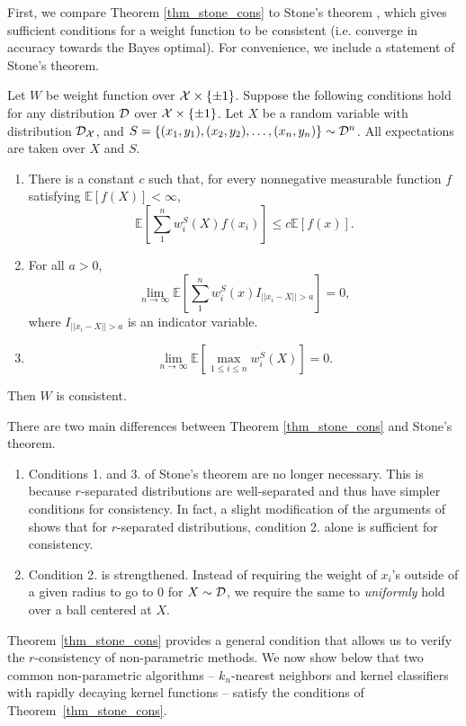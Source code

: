 First, we compare Theorem \ref{thm_stone_cons} to Stone's theorem \cite{Stone77}, which gives sufficient conditions for a weight function to be consistent (i.e. converge in accuracy towards the Bayes optimal). For convenience, we include a statement of Stone's theorem. 
\begin{thm}\label{thm_stone}
\cite{Stone77} Let $W$ be weight function over $\mathcal X \times \{\pm 1\}$. Suppose the following conditions hold for any distribution ${\mathcal D}$ over $\mathcal X \times \{\pm 1\}$.  Let $X$ be a random variable with distribution ${\mathcal D}_\mathcal X$, and $S = \{(x_1, y_1), (x_2, y_2), \dots, (x_n, y_n)\} \sim {\mathcal D}^n$. All expectations are taken over $X$ and $S$. 
\begin{enumerate}
	\item There is a constant $c$ such that, for every nonnegative measurable function $f$ satisfying $\mathbb{E} [f(X)] < \infty$, $$\mathbb{E} [\sum_1^n w_i^S(X)f(x_i)] \leq c \mathbb{E} [f(x)].$$
	\item For all $a > 0$, $$\lim_{n \to \infty} \mathbb{E}[\sum_1^n w_i^S(x)I_{||x_i - X|| > a}] = 0,$$ where $I_{||x_i - X|| > a}$ is an indicator variable. 
	\item $$\lim_{n \to \infty} \mathbb{E}[\max_{1 \leq i \leq n} w_i^S(X)] = 0.$$
\end{enumerate}
Then $W$ is consistent. 
\end{thm}
There are two main differences between Theorem \ref{thm_stone_cons} and Stone's theorem.
 \begin{enumerate}
 	\item Conditions 1. and 3. of Stone's theorem are no longer necessary. This is because $r$-separated distributions are well-separated and thus have simpler conditions for consistency. In fact, a slight modification of the arguments of~\cite{Stone77} shows that for $r$-separated distributions, condition 2. alone is sufficient for consistency.
 	\item Condition 2. is strengthened. Instead of requiring the weight of $x_i$'s outside of a given radius to go to $0$ for $X \sim {\mathcal D}$, we require the same to \textit{uniformly} hold over a ball centered at $X$. 
\end{enumerate}  
 


Theorem \ref{thm_stone_cons} provides a general condition that allows us to verify the $r$-consistency of non-parametric methods. We now show below that two common non-parametric algorithms -- $k_n$-nearest neighbors and kernel classifiers with rapidly decaying kernel functions -- satisfy the conditions of Theorem~\ref{thm_stone_cons}.
 
